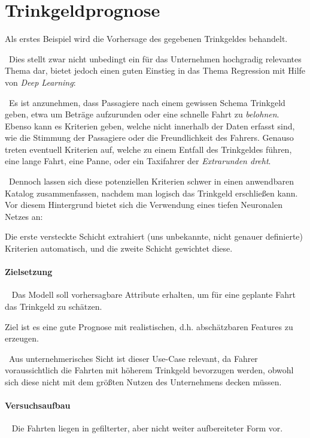 \newpage
\label{Prognosen}
\section{Trinkgeldprognose}
\label{sec:TipPred}
Als erstes Beispiel wird die Vorhersage des gegebenen Trinkgeldes behandelt. 

~\newline Dies stellt zwar nicht unbedingt ein für das Unternehmen hochgradig relevantes Thema dar, bietet jedoch einen guten Einstieg in das Thema Regression mit Hilfe von \textit{Deep Learning}:

~\newline Es ist anzunehmen, dass Passagiere nach einem gewissen Schema Trinkgeld geben, etwa um Beträge aufzurunden oder eine schnelle Fahrt zu \textit{belohnen}. Ebenso kann es Kriterien geben, welche nicht innerhalb der Daten erfasst sind, wie die Stimmung der Passagiere oder die Freundlichkeit des Fahrers. Genauso treten eventuell Kriterien auf, welche zu einem Entfall des Trinkgeldes führen, eine lange Fahrt, eine Panne, oder ein Taxifahrer der \textit{Extrarunden dreht}. 

~\newline Dennoch lassen sich diese potenziellen Kriterien schwer in einen anwendbaren Katalog zusammenfassen, nachdem man logisch das Trinkgeld erschließen kann. Vor diesem Hintergrund bietet sich die Verwendung eines tiefen Neuronalen Netzes an: 

Die erste versteckte Schicht extrahiert (uns unbekannte, nicht genauer definierte) Kriterien automatisch, und die zweite Schicht gewichtet diese. 
\paragraph{Zielsetzung} ~\newline
Das Modell soll vorhersagbare Attribute erhalten, um für eine geplante Fahrt das Trinkgeld zu schätzen. 

Ziel ist es eine gute Prognose mit realistischen, d.h. abschätzbaren Features zu erzeugen. 

~\newline Aus unternehmerisches Sicht ist dieser Use-Case relevant, da Fahrer voraussichtlich die Fahrten mit höherem Trinkgeld bevorzugen werden, obwohl sich diese nicht mit dem größten Nutzen des Unternehmens decken müssen. 
\paragraph{Versuchsaufbau} ~\newline
Die Fahrten liegen in gefilterter, aber nicht weiter aufbereiteter Form vor. 

